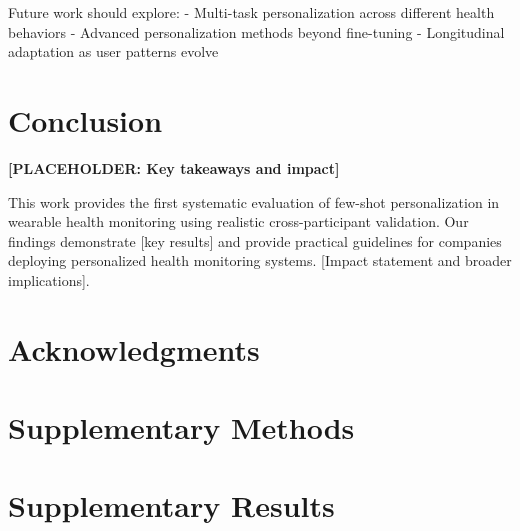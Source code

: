 \documentclass[twocolumn]{article}
\begin{document}
Future work should explore:
- Multi-task personalization across different health behaviors
- Advanced personalization methods beyond fine-tuning
- Longitudinal adaptation as user patterns evolve

\section{Conclusion}
\label{sec:conclusion}

\textbf{[PLACEHOLDER: Key takeaways and impact]}

This work provides the first systematic evaluation of few-shot personalization in wearable health monitoring using realistic cross-participant validation. Our findings demonstrate [key results] and provide practical guidelines for companies deploying personalized health monitoring systems. [Impact statement and broader implications].

\section{Acknowledgments}




\appendix

\section{Supplementary Methods}
\label{sec:supp_methods}

\section{Supplementary Results}  
\label{sec:supp_results}
\end{document}
